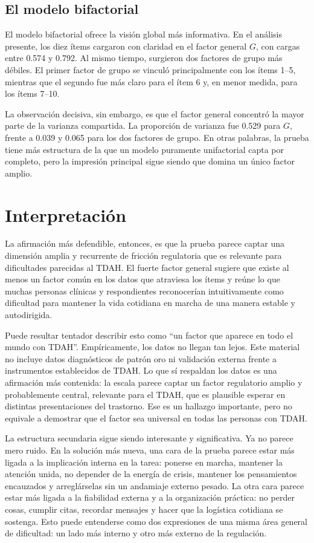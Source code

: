 \documentclass[11pt,a4paper]{article}
\begin{document}
\subsection{El modelo bifactorial}
El modelo bifactorial ofrece la visión global más informativa. En el análisis presente, los diez ítems cargaron con claridad en el factor general $G$, con cargas entre 0.574 y 0.792. Al mismo tiempo, surgieron dos factores de grupo más débiles. El primer factor de grupo se vinculó principalmente con los ítems 1--5, mientras que el segundo fue más claro para el ítem 6 y, en menor medida, para los ítems 7--10.

La observación decisiva, sin embargo, es que el factor general concentró la mayor parte de la varianza compartida. La proporción de varianza fue 0.529 para $G$, frente a 0.039 y 0.065 para los dos factores de grupo. En otras palabras, la prueba tiene más estructura de la que un modelo puramente unifactorial capta por completo, pero la impresión principal sigue siendo que domina un único factor amplio.

\section{Interpretación}
La afirmación más defendible, entonces, es que la prueba parece captar una dimensión amplia y recurrente de fricción regulatoria que es relevante para dificultades parecidas al TDAH. El fuerte factor general sugiere que existe al menos un factor común en los datos que atraviesa los ítems y reúne lo que muchas personas clínicas y respondientes reconocerían intuitivamente como dificultad para mantener la vida cotidiana en marcha de una manera estable y autodirigida.

Puede resultar tentador describir esto como \enquote{un factor que aparece en todo el mundo con TDAH}. Empíricamente, los datos no llegan tan lejos. Este material no incluye datos diagnósticos de patrón oro ni validación externa frente a instrumentos establecidos de TDAH. Lo que sí respaldan los datos es una afirmación más contenida: la escala parece captar un factor regulatorio amplio y probablemente central, relevante para el TDAH, que es plausible esperar en distintas presentaciones del trastorno. Ese es un hallazgo importante, pero no equivale a demostrar que el factor sea universal en todas las personas con TDAH.

La estructura secundaria sigue siendo interesante y significativa. Ya no parece mero ruido. En la solución más nueva, una cara de la prueba parece estar más ligada a la implicación interna en la tarea: ponerse en marcha, mantener la atención unida, no depender de la energía de crisis, mantener los pensamientos encauzados y arreglárselas sin un andamiaje externo pesado. La otra cara parece estar más ligada a la fiabilidad externa y a la organización práctica: no perder cosas, cumplir citas, recordar mensajes y hacer que la logística cotidiana se sostenga. Esto puede entenderse como dos expresiones de una misma área general de dificultad: un lado más interno y otro más externo de la regulación.
\end{document}
